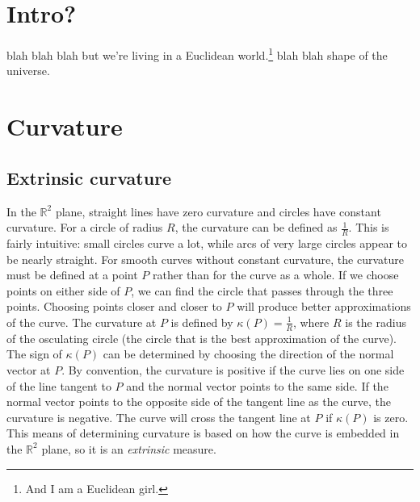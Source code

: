 \documentclass{article}
\title{\todo{FANCY TITLE}}
\author{BarbaraJoy Jones}
\date{4 December 2009}
\begin{document}
\maketitle

\section{Intro?}
blah blah blah but we're living in a Euclidean world.\footnote{And I am a Euclidean girl.\cite{madonna}} blah blah shape of the universe.

\section{Curvature}
\subsection{Extrinsic curvature}
In the $\mathbb{R}^2$ plane, straight lines have zero curvature and circles have constant curvature.
For a circle of radius $R$, the curvature can be defined as $\frac{1}{R}$.
This is fairly intuitive: small circles curve a lot, while arcs of very large circles appear to be nearly straight.\cite{adventures}
For smooth curves without constant curvature, the curvature must be defined at a point $P$ rather than for the curve as a whole.
If we choose points on either side of $P$, we can find the circle that passes through the three points.
Choosing points closer and closer to $P$ will produce better approximations of the curve.
The curvature at $P$ is defined by $\kappa(P) = \frac{1}{R}$, where $R$ is the radius of the osculating circle (the circle that is the best approximation of the curve).
The sign of $\kappa(P)$ can be determined by choosing the direction of the normal vector at $P$.
By convention, the curvature is positive if the curve lies on one side of the line tangent to $P$ and the normal vector points to the same side.
If the normal vector points to the opposite side of the tangent line as the curve, the curvature is negative.
The curve will cross the tangent line at $P$ if $\kappa(P)$ is zero.\cite{singer}
This means of determining curvature is based on how the curve is embedded in the $\mathbb{R}^2$ plane, so it is an \emph{extrinsic} measure.
\end{document}
